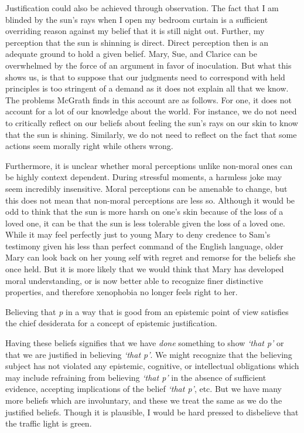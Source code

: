 \documentclass[phdthesis,12pt,final]{wuthesis}
\theoremstyle{definition}
\theoremstyle{definition}
\theoremstyle{definition}
\theoremstyle{definition}
\theoremstyle{remark}
\begin{document}
Justification could also be achieved through observation. The fact that I am blinded by the sun's rays when I open my bedroom curtain is a sufficient overriding reason against my belief that it is still night out. Further, my perception that the sun is shinning is direct. Direct perception then is an adequate ground to hold a given belief. Mary, Sue, and Clarice can be overwhelmed by the force of an argument in favor of inoculation. But what this shows us, is that to suppose that our judgments need to correspond with held principles is too stringent of a demand as it does not explain all that we know. The problems McGrath finds in this account are as follows. For one, it does not account for a lot of our knowledge about the world. For instance, we do not need to critically reflect on our beliefs about feeling the sun's rays on our skin to know that the sun is shining. Similarly, we do not need to reflect on the fact that some actions seem morally right while others wrong.

Furthermore, it is unclear whether moral perceptions unlike non-moral ones can be highly context dependent. During stressful moments, a harmless joke may seem incredibly insensitive. Moral perceptions can be amenable to change, but this does not mean that non-moral perceptions are less so. Although it would be odd to think that the sun is more harsh on one's skin because of the loss of a loved one, it can be that the sun is less tolerable given the loss of a loved one. While it may feel perfectly just to young Mary to deny credence to Sam's testimony given his less than perfect command of the English language, older Mary can look back on her young self with regret and remorse for the beliefs she once held. But it is more likely that we would think that Mary has developed moral understanding, or is now better able to recognize finer distinctive properties, and therefore xenophobia no longer feels right to her.

Believing that \emph{p} in a way that is good from an epistemic point of view satisfies the chief desiderata for a concept of epistemic justification.

Having these beliefs signifies that we have \emph{done} something to show \emph{`that p'} or that we are justified in believing \emph{`that p'}. We might recognize that the believing subject has not violated any epistemic, cognitive, or intellectual obligations which may include refraining from believing \emph{`that p'} in the absence of sufficient evidence, accepting implications of the belief \emph{`that p'}, etc. But we have many more beliefs which are involuntary, and these we treat the same as we do the justified beliefs. Though it is plausible, I would be hard pressed to disbelieve that the traffic light is green.
\end{document}
